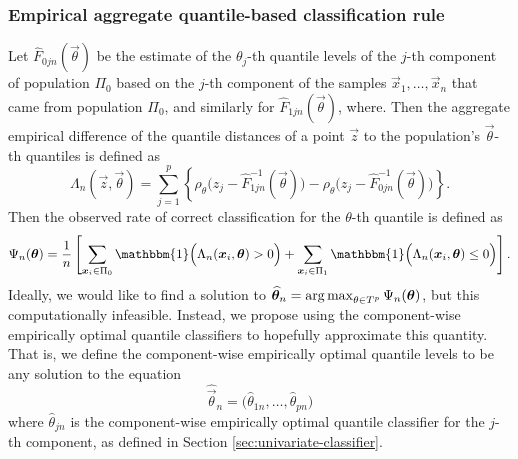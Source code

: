\subsubsection{Empirical aggregate quantile-based classification rule}
\label{sec:empirical-aggregate}


Let $\widehat{F}_{0jn}(\vec{\theta})$ be the estimate of the $\theta_j$-th
quantile levels of the $j$-th component of population $\Pi_0$ based on the
$j$-th component of the samples $\vec{x}_1, \dots, \vec{x}_n$ that came from
population $\Pi_0$, and similarly for $\widehat{F}_{1jn}(\vec{\theta})$, where.
Then the aggregate empirical difference of the quantile distances of a point
$\vec{z}$ to the population's $\vec{\theta}$-th quantiles is defined as
\begin{equation}
  \label{eq:multivariate-phi-empirical}
  \Lambda_n (\vec{z}, \vec{\theta}) = \sum_{j=1}^p \left\{
    \rho_{\theta}\Big(z_j - \widehat{F}_{1jn}^{-1}(\vec{\theta})\Big) -
    \rho_{\theta}\Big(z_j - \widehat{F}_{0jn}^{-1}(\vec{\theta})\Big)
  \right\}.
\end{equation}
Then the observed rate of correct classification for the $\theta$-th
quantile is defined as
\begin{equation}
    \Psi_n(\vec{\theta}) = \frac{1}{n} \left[
      \sum_{\vec{x}_i \in \Pi_0}
      \mathbbm{1}\Big( \Lambda_n(\vec{x}_i, \vec{\theta}) > 0 \Big) +
      \sum_{\vec{x}_i \in \Pi_1}
      \mathbbm{1}\Big( \Lambda_n(\vec{x}_i, \vec{\theta}) \leq 0 \Big)
    \right].
\end{equation}
Ideally, we would like to find a solution to
$\widehat{\bm{\theta}}_n = \operatorname*{arg\,max}_{\theta \in T^p} \Psi_n(\bm{\theta})$, but
this computationally infeasible. Instead, we propose using the component-wise
empirically optimal quantile classifiers to hopefully approximate this quantity.
That is, we define the component-wise empirically optimal quantile levels to be
any solution to the equation
\begin{equation}
  \label{eq:marginally-optimal-levels}
  \widehat{\vec{\theta}}_n = \Big(
  \widehat{\theta}_{1n}, \dots, \widehat{\theta}_{pn}
  \Big)
\end{equation}
where $\widehat{\theta}_{jn}$ is the component-wise empirically optimal quantile
classifier for the $j$-th component, as defined in Section
\ref{sec:univariate-classifier}.

